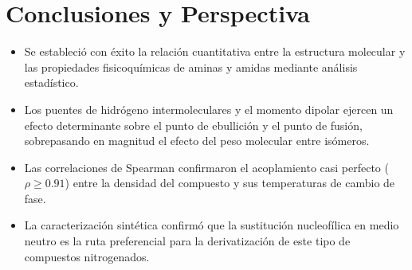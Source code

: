 

\section{Conclusiones y Perspectiva}
\fontsize{12}{14}\selectfont
\begin{itemize}
	\item Se estableció con éxito la relación cuantitativa entre la estructura
	molecular y las propiedades fisicoquímicas de aminas y amidas mediante análisis
	estadístico.
	\item Los puentes de hidrógeno intermoleculares y el momento dipolar ejercen un
	efecto determinante sobre el punto de ebullición y el punto de fusión,
	sobrepasando en magnitud el efecto del peso molecular entre isómeros.
	\item Las correlaciones de Spearman confirmaron el acoplamiento casi perfecto
	($\rho \geq \num{0.91}$) entre la densidad del compuesto y sus temperaturas de
	cambio de fase.
	\item La caracterización sintética confirmó que la sustitución nucleofílica en
	medio neutro es la ruta preferencial para la derivatización de este tipo de
	compuestos nitrogenados.
\end{itemize}

